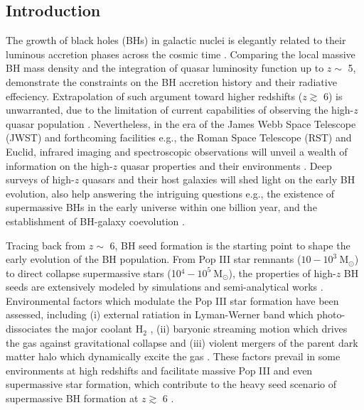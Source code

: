 \documentclass[nolinenumbers,preprint2,tighten]{aastex631}
\newcommand{\Msun}{\mathrm{M_\odot}}
\newcommand{\hh}{\mathrm{H_2}}
\begin{document}
\begin{CJK*}{UTF8}{gbsn}
\section{Introduction} \label{sec:intro}
The growth of black holes (BHs) in galactic nuclei is elegantly related to their luminous accretion phases 
across the cosmic time \citep{1982MNRAS.200..115S,1992MNRAS.259..725S}. 
Comparing the local massive BH mass density and the integration of quasar luminosity function up to $z\sim$ 5, 
\citet{2002MNRAS.335..965Y} demonstrate the constraints on the BH accretion history and their radiative effeciency.
Extrapolation of such argument toward higher redshifts ($z\gtrsim$ 6) is unwarranted, 
due to the limitation of current capabilities of observing the high-$z$ quasar population \citep{2019BAAS...51c.121F}. 
Nevertheless, 
in the era of the James Webb Space Telescope (JWST) and forthcoming facilities 
e.g., the Roman Space Telescope (RST) and Euclid, 
infrared imaging and spectroscopic observations will unveil a wealth of information on the
high-$z$ quasar properties and their environments 
\citep{2019BAAS...51c..45R, 2019arXiv190205569A, 2011arXiv1110.3193L}. 
Deep surveys of high-$z$ quasars and their host galaxies will shed light on the early BH evolution, 
also help answering the intriguing questions e.g., 
the existence of supermassive BHs in the early universe within one billion year, 
and the establishment of BH-galaxy coevolution \citep{2012Sci...337..544V,2013ASSL..396..293H,2020ARA&A..58...27I}.

Tracing back from $z\sim$ 6, BH seed formation is the starting point to shape the early evolution of the BH population.
From Pop III star remnants ($10-10^3 ~\Msun$) to direct collapse supermassive stars (10$^4-10^5 ~\Msun$), 
the properties of high-$z$ BH seeds are extensively modeled by simulations and semi-analytical works 
\citep[e.g.,][Toyouchi 2022]{2001ApJ...546..635O,2002Sci...295...93A,2006ApJ...652....6Y,2011MNRAS.416.2748I,
2012ApJ...756...93H,2013ApJ...778..178H,2014MNRAS.439.3798F,
2014MNRAS.445L.109I,2014MNRAS.445..544S,2014MNRAS.445..107V,2020MNRAS.499.5960S}. 
Environmental factors which modulate the Pop III star formation have been assessed, 
including (i) external ratiation in Lyman-Werner band which photo-dissociates the major coolant $\hh$ 
\citep{2002ApJ...569..558O,2003Natur.425..812B,2010MNRAS.402.1249S},
(ii) baryonic streaming motion which drives the gas against gravitational collapse 
\citep{2012MNRAS.424.1335F, 2014MNRAS.439.1092T, 2018ApJ...855...17H}
and 
(iii) violent mergers of the parent dark matter halo which dynamically excite the gas 
\citep{2003ApJ...592..645Y,2019Natur.566...85W}. 
These factors prevail in some environments at high redshifts and facilitate massive Pop III and even supermassive star formation, 
which contribute to the heavy seed scenario of supermassive BH formation at $z\gtrsim$ 6 
\citep[see a review by][]{2020ARA&A..58...27I}. 


\end{CJK*}
\end{document}
